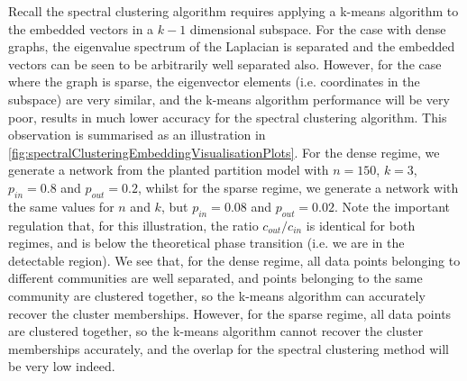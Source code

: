Recall the spectral clustering algorithm requires applying a k-means algorithm to the embedded vectors in a $k-1$ dimensional subspace.
For the case with dense graphs, the eigenvalue spectrum of the Laplacian is separated and the embedded vectors can be seen to be arbitrarily well separated also.
However, for the case where the graph is sparse, the eigenvector elements (i.e. coordinates in the subspace) are very similar, and the k-means algorithm performance will be very poor, results in much lower accuracy for the spectral clustering algorithm.
This observation is summarised as an illustration in \cref{fig:spectralClusteringEmbeddingVisualisationPlots}.
For the dense regime, we generate a network from the planted partition model with $n=150$, $k=3$, $p_{in}=0.8$ and $p_{out}=0.2$, whilst for the sparse regime, we generate a network with the same values for $n$ and $k$, but $p_{in}=0.08$ and $p_{out}=0.02$.
Note the important regulation that, for this illustration, the ratio $c_{out}/c_{in}$ is identical for both regimes, and is below the theoretical phase transition (i.e. we are in the detectable region).
We see that, for the dense regime, all data points belonging to different communities are well separated, and points belonging to the same community are clustered together, so the k-means algorithm can accurately recover the cluster memberships.
However, for the sparse regime, all data points are clustered together, so the k-means algorithm cannot recover the cluster memberships accurately, and the overlap for the spectral clustering method will be very low indeed.

